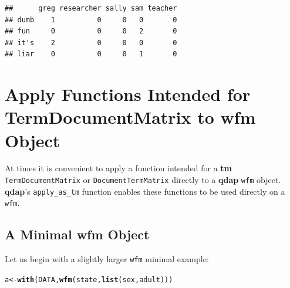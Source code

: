 \documentclass{article}\usepackage[]{graphicx}\usepackage[]{color}
\makeatletter
\newcommand{\hlstd}[1]{\textcolor[rgb]{0.345,0.345,0.345}{#1}}%
\newcommand{\hlkwb}[1]{\textcolor[rgb]{0.69,0.353,0.396}{#1}}%
\newcommand{\hlkwd}[1]{\textcolor[rgb]{0.737,0.353,0.396}{\textbf{#1}}}%
\newenvironment{kframe}{%
 \def\at@end@of@kframe{}%
 \ifinner\ifhmode%
  \def\at@end@of@kframe{\end{minipage}}%
  \begin{minipage}{\columnwidth}%
 \fi\fi%
 \def\FrameCommand##1{\hskip\@totalleftmargin \hskip-\fboxsep
 \colorbox{shadecolor}{##1}\hskip-\fboxsep
     \hskip-\linewidth \hskip-\@totalleftmargin \hskip\columnwidth}%
 \MakeFramed {\advance\hsize-\width
   \@totalleftmargin\z@ \linewidth\hsize
   \@setminipage}}%
 {\par\unskip\endMakeFramed%
 \at@end@of@kframe}
\newenvironment{knitrout}{}{} %
\makeatother
\begin{document}
\begin{knitrout}
\color{fgcolor}\begin{kframe}
\begin{verbatim}
##      greg researcher sally sam teacher
## dumb    1          0     0   0       0
## fun     0          0     0   2       0
## it's    2          0     0   0       0
## liar    0          0     0   1       0
\end{verbatim}
\end{kframe}
\end{knitrout}



\section{Apply Functions Intended for TermDocumentMatrix to wfm Object}

\hspace{.4cm} At times it is convenient to apply a function intended for a \textbf{tm} \texttt{TermDocumentMatrix} or \texttt{DocumentTermMatrix} directly to a \textbf{qdap} \texttt{wfm} object.  \textbf{qdap}'s \texttt{apply\_as\_tm} function enables these functions to be used directly on a \texttt{wfm}.

\subsection{A Minimal wfm Object}

\hspace{.4cm} Let us begin with a slightly larger \texttt{wfm} minimal example:

\begin{knitrout}
\color{fgcolor}\begin{kframe}
\begin{alltt}
\hlstd{a} \hlkwb{<-} \hlkwd{with}\hlstd{(DATA,} \hlkwd{wfm}\hlstd{(state,} \hlkwd{list}\hlstd{(sex, adult)))}
\end{alltt}
\end{kframe}
\end{knitrout}
\end{document}

